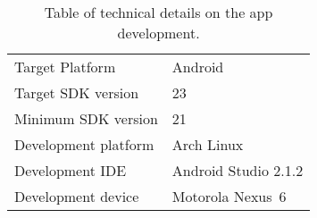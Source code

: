 \begin{table}[h]
\begin{tabular}{l|l}
  Target Platform           & Android              \\
  Target \acs{SDK} version  & 23                   \\
  Minimum \acs{SDK} version & 21                   \\
  Development platform      & Arch Linux           \\
  Development \acs{IDE}     & Android Studio 2.1.2 \\
  Development device        & Motorola Nexus~6     \\
\end{tabular}
  \caption[Short description]{%
  Table of technical details on the app development.
  }\label{tab:app-dev}
\end{table}



\begin{itemize}
\end{itemize}
